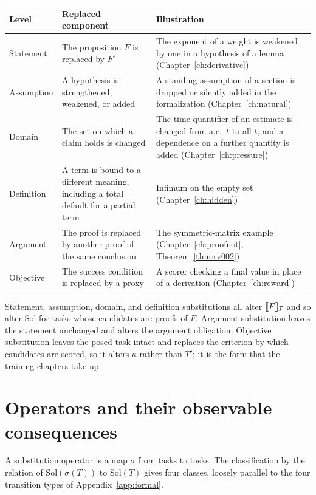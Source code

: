 \begin{center}
\small
\begin{tabular}{@{}p{2.4cm}p{4.3cm}p{5.6cm}@{}}
\toprule
Level & Replaced component & Illustration \\
\midrule
Statement & The proposition $F$ is replaced by $F'$ & The exponent of a weight is weakened by one in a hypothesis of a lemma (Chapter~\ref{ch:derivative}) \\
Assumption & A hypothesis is strengthened, weakened, or added & A standing assumption of a section is dropped or silently added in the formalization (Chapter~\ref{ch:natural}) \\
Domain & The set on which a claim holds is changed & The time quantifier of an estimate is changed from a.e.\ $t$ to all $t$, and a dependence on a further quantity is added (Chapter~\ref{ch:pressure}) \\
Definition & A term is bound to a different meaning, including a total default for a partial term & Infimum on the empty set (Chapter~\ref{ch:hidden}) \\
Argument & The proof is replaced by another proof of the same conclusion & The symmetric-matrix example (Chapter~\ref{ch:proofnot}, Theorem~\ref{thm:rv002}) \\
Objective & The success condition is replaced by a proxy & A scorer checking a final value in place of a derivation (Chapter~\ref{ch:reward}) \\
\bottomrule
\end{tabular}
\end{center}

Statement, assumption, domain, and definition substitutions all alter $\llbracket F \rrbracket_{\mathcal{I}}$ and so alter $\mathrm{Sol}$ for tasks whose candidates are proofs of $F$. Argument substitution leaves the statement unchanged and alters the argument obligation. Objective substitution leaves the posed task intact and replaces the criterion by which candidates are scored, so it alters $\kappa$ rather than $T'$; it is the form that the training chapters take up.

\section{Operators and their observable consequences}

A substitution operator is a map $\sigma$ from tasks to tasks. The classification by the relation of $\mathrm{Sol}(\sigma(T))$ to $\mathrm{Sol}(T)$ gives four classes, loosely parallel to the four transition types of Appendix~\ref{app:formal}.

